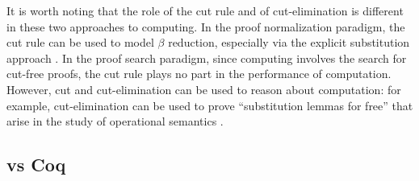 It is worth noting that the role of the cut rule and of
cut-elimination is different in these two approaches to computing.
In the proof normalization paradigm, the cut rule can be used to model
$\beta$ reduction, especially via the explicit substitution approach
\cite{lengrand06phd}. In the proof search paradigm, since computing involves
the search for cut-free proofs, the cut rule plays no part in the
performance of computation.  However, cut and cut-elimination can be
used to reason about computation: for example, cut-elimination can be
used to prove ``substitution lemmas for free'' that arise in the study
of operational semantics \cite{gacek12jar}.




\subsection{\lP vs Coq}

